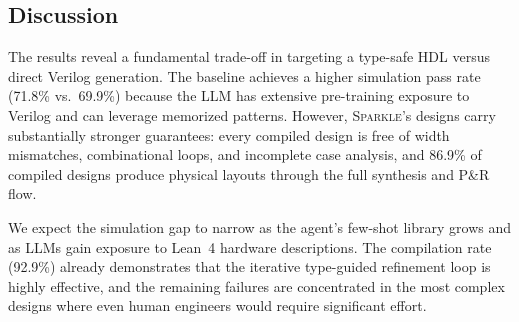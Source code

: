 \subsection{Discussion}
\label{sec:discussion}

The results reveal a fundamental trade-off in targeting a type-safe HDL versus direct Verilog generation. The baseline achieves a higher simulation pass rate (71.8\% vs.\ 69.9\%) because the LLM has extensive pre-training exposure to Verilog and can leverage memorized patterns. However, \textsc{Sparkle}'s designs carry substantially stronger guarantees: every compiled design is free of width mismatches, combinational loops, and incomplete case analysis, and 86.9\% of compiled designs produce physical layouts through the full synthesis and P\&R flow.

We expect the simulation gap to narrow as the agent's few-shot library grows and as LLMs gain exposure to Lean~4 hardware descriptions. The compilation rate (92.9\%) already demonstrates that the iterative type-guided refinement loop is highly effective, and the remaining failures are concentrated in the most complex designs where even human engineers would require significant effort.

